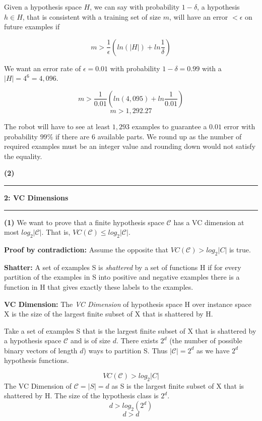 \documentclass[11pt]{article}
\newcommand\question[2]{\vspace{.25in}\hrule\textbf{#1: #2}\vspace{.5em}\hrule\vspace{.10in}}
\renewcommand\part[1]{\vspace{.10in}\textbf{(#1)}}
\begin{document}
Given a hypothesis space $H$, we can say with probability $1 - \delta$, a hypothesis $h \in H$, that is consistent with a training set of size $m$, will have an error $< \epsilon$ on future examples if

$$m > \frac{1}{\epsilon}(ln(|H|) + ln\frac{1}{\delta})$$

We want an error rate of $\epsilon = 0.01$ with probability $1 - \delta = 0.99$ with a $|H| = 4^6 = 4,096$.

$$m > \frac{1}{0.01}(ln(4,095) + ln\frac{1}{0.01})$$
$$m > 1,292.27$$

The robot will have to see at least $1,293$ examples to guarantee a $0.01$ error with probability $99\%$ if there are 6 available parts. We round up as the number of required examples must be an integer value and rounding down would not satisfy the equality.

\newpage
\part{2}

\question{2}{VC Dimensions}

\part{1} We want to prove that a finite hypothesis space $\mathcal{C}$ has a VC dimension at most $log_2|\mathcal{C}|$. That is, $VC(\mathcal{C}) \leq log_2|\mathcal{C}|$.

\textbf{Proof by contradiction:} Assume the opposite that $VC(\mathcal{C}) > log_2|C|$ is true.

\textbf{Shatter:} A set of examples S is \textit{shattered} by a set of functions H if for every partition of the examples in S into positive and negative examples there is a function in H that gives exactly these labels to the examples.

\textbf{VC Dimension:} The \textit{VC Dimension} of hypothesis space H over instance space X is the size of the largest finite subset of X that is shattered by H.

Take a set of examples S that is the largest finite subset of X that is shattered by a hypothesis space $\mathcal{C}$ and is of size $d$. There exists $2^d$ (the number of possible binary vectors of length $d$) ways to partition S. Thus $|\mathcal{C}| = 2^d$ as we have $2^d$ hypothesis functions.

$$VC(\mathcal{C}) > log_2|C|$$
The VC Dimension of $\mathcal{C} = |S| = d$ as S is the largest finite subset of X that is shattered by H. The size of the hypothesis class is $2^d$.
$$d > log_2(2^d)$$
$$d > d$$
\end{document}
